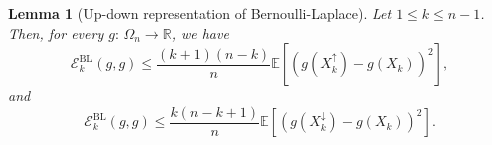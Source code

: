 \documentclass[12pt,final]{amsart}
\newcommand{\var}{\operatorname{Var}}
\newcommand{\1}{\mathbf{1}}
\newtheorem{lemma}[theorem]{Lemma}
\newcommand{\E}[1]{\mathbb{E}\left[#1\right]}
\newcommand{\Ecal}{\mathcal{E}}
\newcommand{\R}{\mathbb{R}}
\begin{document}
\begin{lemma}[Up-down representation of Bernoulli-Laplace]\label{lem:up-down-BL}
   Let $1\leq k\leq n-1$. Then, for every $g:\, \Omega_n\to \R$, we have 
   $$
   \Ecal^{\operatorname{BL}}_k(g,g)\leq \frac{(k+1)(n-k)}{n} \mathbb{E}\left[(g(X^{\uparrow}_k)-g(X_k))^2\right], 
   $$
   and 
    $$
   \Ecal^{\operatorname{BL}}_k(g,g)\leq \frac{k(n-k+1)}{n} \mathbb{E}\left[(g(X^{\downarrow}_k)-g(X_k))^2\right]. 
   $$
\end{lemma}



\end{document}
